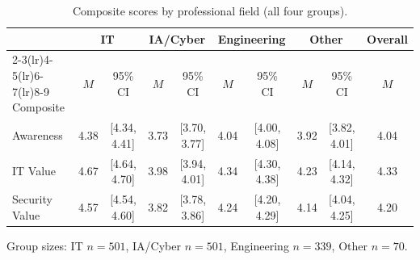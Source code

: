 \begin{table}[ht]
\centering
\caption{Composite scores by professional field (all four groups).}
\label{tab:field_breakout}
\small
\setlength{\tabcolsep}{4pt}
\begin{tabular}{@{}lccccccccc@{}}
\toprule
 & \multicolumn{2}{c}{IT} & \multicolumn{2}{c}{IA/Cyber} & \multicolumn{2}{c}{Engineering} & \multicolumn{2}{c}{Other} & Overall \\
\cmidrule(lr){2-3}\cmidrule(lr){4-5}\cmidrule(lr){6-7}\cmidrule(lr){8-9}
Composite & $M$ & 95\% CI & $M$ & 95\% CI & $M$ & 95\% CI & $M$ & 95\% CI & $M$ \\
\midrule
Awareness & 4.38 & [4.34, 4.41] & 3.73 & [3.70, 3.77] & 4.04 & [4.00, 4.08] & 3.92 & [3.82, 4.01] & 4.04 \\
IT Value & 4.67 & [4.64, 4.70] & 3.98 & [3.94, 4.01] & 4.34 & [4.30, 4.38] & 4.23 & [4.14, 4.32] & 4.33 \\
Security Value & 4.57 & [4.54, 4.60] & 3.82 & [3.78, 3.86] & 4.24 & [4.20, 4.29] & 4.14 & [4.04, 4.25] & 4.20 \\
\bottomrule
\end{tabular}

\smallskip
\footnotesize Group sizes: IT $n=501$, IA/Cyber $n=501$, Engineering $n=339$, Other $n=70$.
\end{table}
